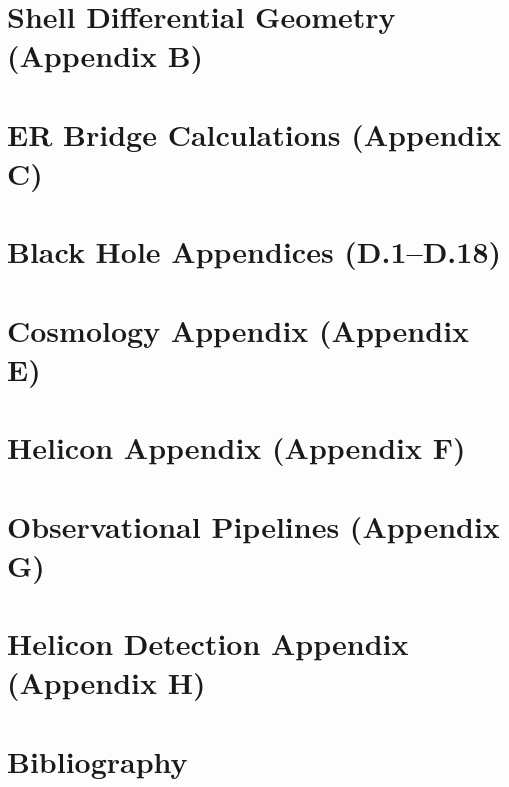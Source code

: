 \documentclass[11pt,oneside]{book}
\theoremstyle{definition}
\begin{document}
\chapter{Shell Differential Geometry (Appendix B)}
\chapter{ER Bridge Calculations (Appendix C)}
\chapter{Black Hole Appendices (D.1--D.18)}
\chapter{Cosmology Appendix (Appendix E)}
\chapter{Helicon Appendix (Appendix F)}
\chapter{Observational Pipelines (Appendix G)}
\chapter{Helicon Detection Appendix (Appendix H)}

\backmatter

\chapter*{Bibliography}
\end{document}
